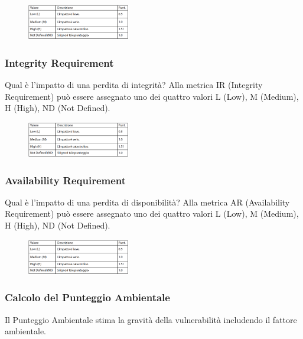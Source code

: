 \begin{figure}[hbpt!]
    \centering
    \includegraphics[width=0.4\textwidth]{./Images/cap2/2.20.png}
\end{figure}
\FloatBarrier

\subsubsection{Integrity Requirement}
Qual è l’impatto di una
perdita di integrità? Alla metrica IR (Integrity Requirement) può essere assegnato
uno dei quattro valori
L (Low), M (Medium), H (High), ND (Not Defined).

\begin{figure}[hbpt!]
    \centering
    \includegraphics[width=0.4\textwidth]{./Images/cap2/2.20.png}
\end{figure}
\FloatBarrier

\subsubsection{Availability Requirement}
Qual è l’impatto di una
perdita di disponibilità? Alla metrica AR (Availability Requirement) può essere assegnato
uno dei quattro valori
L (Low), M (Medium), H (High), ND (Not Defined).

\begin{figure}[hbpt!]
    \centering
    \includegraphics[width=0.4\textwidth]{./Images/cap2/2.20.png}
\end{figure}
\FloatBarrier

\subsubsection{Calcolo del Punteggio Ambientale}
Il Punteggio Ambientale stima la gravità della
vulnerabilità includendo il fattore ambientale.

